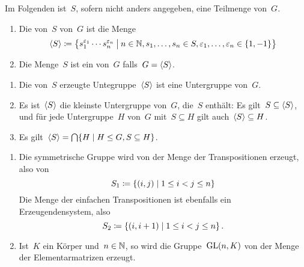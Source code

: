 \begin{convention}
  Im Folgenden ist~$S$, sofern nicht anders angegeben, eine Teilmenge von~$G$.
\end{convention}

\begin{definition}
  \leavevmode
  \begin{enumerate}
    \item
      Die von~$S$  von~$G$ ist die Menge
      \[
        \gen{S}
        \defined
        \bigl\{
          s_1^{\varepsilon_1} \dotsm s_n^{\varepsilon_n}
        \suchthat[\big]
          n \in \Natural,
          s_1, \dotsc, s_n \in S,
          \varepsilon_1, \dotsc, \varepsilon_n \in \{1, -1\}
        \bigr\}
      \]
    \item
      Die Menge~$S$ ist ein  von~$G$ falls~$G = \langle S\rangle$.
  \end{enumerate}
\end{definition}

\begin{proposition}
  \leavevmode
  \begin{enumerate}
    \item
      Die von~$S$ erzeugte Untegruppe~$\langle S\rangle$ ist eine Untergruppe von~$G$.
    \item
      Es ist~$\langle S\rangle$ die kleinste Untergruppe von~$G$, die~$S$ enthält:
      Es gilt~$S \subseteq \langle S\rangle$, und für jede Untergruppe~$H$ von~$G$ mit~$S \subseteq H$ gilt auch~$\langle S\rangle \subseteq H$.
    \item
      Es gilt~$\gen{S} = \bigcap \{ H \suchthat H \subgroupeq G, S \subseteq H \}$.
  \end{enumerate}
\end{proposition}


\begin{example}
  \leavevmode
  \begin{enumerate}
    \item
      Die symmetrische Gruppe wird von der Menge der Transpositionen erzeugt, also von
      \[
        S_1
        \defined
        \{
          (i, j)
        \suchthat
          1 \leq i < j \leq n
        \}
      \]
      Die Menge der einfachen Transpositionen ist ebenfalls ein Erzeugendensystem, also
      \[
        S_2
        \defined
        \{
          (i, i+1)
        \suchthat
          1 \leq i < j \leq n
        \} \,.
      \]
    \item
      Ist~$K$ ein Körper und~$n \in \mathbb{N}$, so wird die Gruppe~$\operatorname{GL}(n,K)$ von der Menge der Elementarmatrizen erzeugt.
  \end{enumerate}
\end{example}


